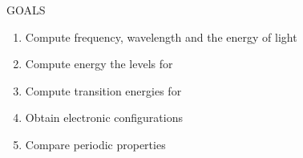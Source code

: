 \documentclass[main.tex]{subfiles}
\begin{document}
\begin{marginfigure}%
\begin{mytcbox}{GOALS}
\begin{enumerate}[label=\protect\circled{\color{white}\arabic*}]
\item Compute frequency, wavelength and the energy of light
\item Compute energy the levels for 
\item Compute transition energies for 
\item Obtain electronic configurations
\item Compare periodic properties
\end{enumerate}
\end{mytcbox}
\end{marginfigure}%
\end{document}
